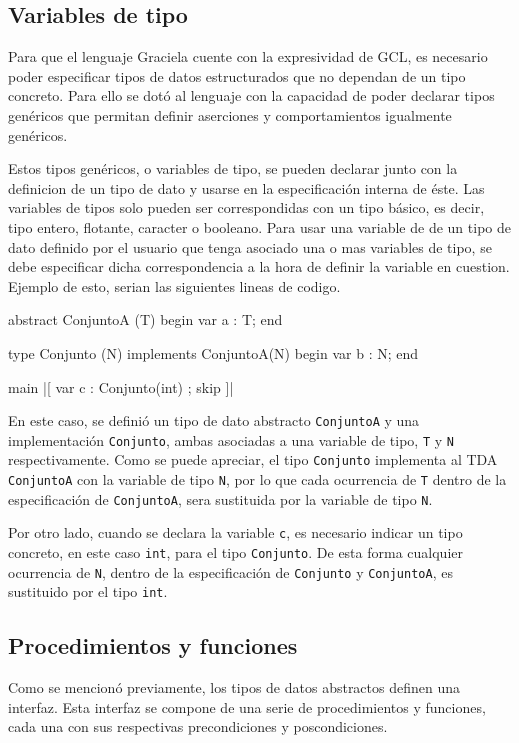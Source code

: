 \subsection{Variables de tipo}
Para que el lenguaje Graciela cuente con la expresividad de GCL, es necesario
poder especificar tipos de datos estructurados que no dependan de un tipo
concreto. Para ello se dotó al lenguaje con la capacidad de poder declarar
tipos genéricos que permitan definir aserciones y comportamientos igualmente
genéricos.

Estos tipos genéricos, o variables de tipo, se pueden declarar junto con la
definicion de un tipo de dato y usarse en la especificación interna de éste.
Las variables de tipos solo pueden ser correspondidas con un tipo básico, es
decir, tipo entero, flotante, caracter o booleano. Para usar una variable de
de un tipo de dato definido por el usuario que tenga asociado una o mas variables
de tipo, se debe especificar dicha correspondencia a la hora de definir la
variable en cuestion. Ejemplo de esto, serian las siguientes lineas de codigo.
 
\begin{gracielacode}
  abstract ConjuntoA (T) begin
    var a : T;
  end

  type Conjunto (N) implements ConjuntoA(N) begin
    var b : N;
  end

  main
   |[ var c : Conjunto(int)
    ; skip 
   ]|

\end{gracielacode}

En este caso, se definió un tipo de dato abstracto \texttt{ConjuntoA} y una
implementación \texttt{Conjunto}, ambas asociadas a una variable de
tipo, \texttt{T} y \texttt{N} respectivamente. Como se puede apreciar, el tipo
\texttt{Conjunto} implementa al TDA \texttt{ConjuntoA} con la
variable de tipo \texttt{N}, por lo que cada ocurrencia de \texttt{T} dentro
de la especificación de \texttt{ConjuntoA}, sera sustituida por la variable de
tipo \texttt{N}.

Por otro lado, cuando se declara la variable \texttt{c}, es necesario indicar
un tipo concreto, en este caso \texttt{int}, para el tipo \texttt{Conjunto}. De esta
forma cualquier ocurrencia de \texttt{N}, dentro de la especificación de
\texttt{Conjunto} y \texttt{ConjuntoA}, es sustituido por el tipo \texttt{int}.




\subsection{Procedimientos y funciones}
Como se mencionó previamente, los tipos de datos abstractos definen una
interfaz. Esta interfaz se compone de una serie de procedimientos y funciones,
cada una con sus respectivas precondiciones y poscondiciones.

